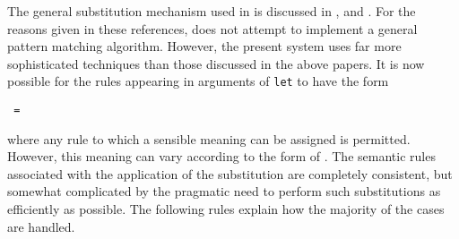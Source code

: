 The general substitution mechanism used in {\REDUCE} is discussed in
\cite{Hearn:68}, and \cite{Hearn:69a}. For the reasons given in these
references, {\REDUCE} does not attempt to implement a general pattern
matching algorithm.  However, the present system uses far more sophisticated
techniques than those discussed in the above papers.  It is now possible for
the rules appearing in arguments of \texttt{let} to have the form
\begin{syntax}
  \texttt{ = }
\end{syntax}
where any rule to which a sensible meaning can be assigned is permitted.
However, this meaning can vary according to the form of . The semantic rules associated with the application of the
substitution are completely consistent, but somewhat complicated by the
pragmatic need to perform such substitutions as efficiently as possible.
The following rules explain how the majority of the cases are handled.

